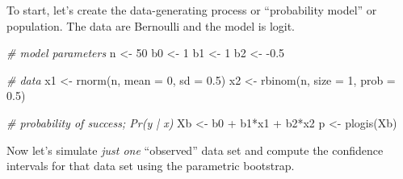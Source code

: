\documentclass[
]{book}
\newenvironment{Shaded}{\begin{snugshade}}{\end{snugshade}}
\newcommand{\AttributeTok}[1]{\textcolor[rgb]{0.77,0.63,0.00}{#1}}
\newcommand{\CommentTok}[1]{\textcolor[rgb]{0.56,0.35,0.01}{\textit{#1}}}
\newcommand{\DecValTok}[1]{\textcolor[rgb]{0.00,0.00,0.81}{#1}}
\newcommand{\FloatTok}[1]{\textcolor[rgb]{0.00,0.00,0.81}{#1}}
\newcommand{\FunctionTok}[1]{\textcolor[rgb]{0.00,0.00,0.00}{#1}}
\newcommand{\NormalTok}[1]{#1}
\newcommand{\OtherTok}[1]{\textcolor[rgb]{0.56,0.35,0.01}{#1}}
\newcommand{\SpecialCharTok}[1]{\textcolor[rgb]{0.00,0.00,0.00}{#1}}
\begin{document}
To start, let's create the data-generating process or ``probability
model'' or population. The data are Bernoulli and the model is logit.

\begin{Shaded}
\begin{Highlighting}[]
\CommentTok{\# model parameters}
\NormalTok{n }\OtherTok{\textless{}{-}} \DecValTok{50}
\NormalTok{b0 }\OtherTok{\textless{}{-}} \DecValTok{1}
\NormalTok{b1 }\OtherTok{\textless{}{-}} \DecValTok{1}
\NormalTok{b2 }\OtherTok{\textless{}{-}} \SpecialCharTok{{-}}\FloatTok{0.5}

\CommentTok{\# data}
\NormalTok{x1 }\OtherTok{\textless{}{-}} \FunctionTok{rnorm}\NormalTok{(n, }\AttributeTok{mean =} \DecValTok{0}\NormalTok{, }\AttributeTok{sd =} \FloatTok{0.5}\NormalTok{)}
\NormalTok{x2 }\OtherTok{\textless{}{-}} \FunctionTok{rbinom}\NormalTok{(n, }\AttributeTok{size =} \DecValTok{1}\NormalTok{, }\AttributeTok{prob =} \FloatTok{0.5}\NormalTok{)}

\CommentTok{\# probability of success; Pr(y | x)}
\NormalTok{Xb }\OtherTok{\textless{}{-}}\NormalTok{ b0 }\SpecialCharTok{+}\NormalTok{ b1}\SpecialCharTok{*}\NormalTok{x1 }\SpecialCharTok{+}\NormalTok{ b2}\SpecialCharTok{*}\NormalTok{x2}
\NormalTok{p }\OtherTok{\textless{}{-}} \FunctionTok{plogis}\NormalTok{(Xb)}
\end{Highlighting}
\end{Shaded}

Now let's simulate \emph{just one} ``observed'' data set and compute the
confidence intervals for that data set using the parametric bootstrap.
\end{document}
